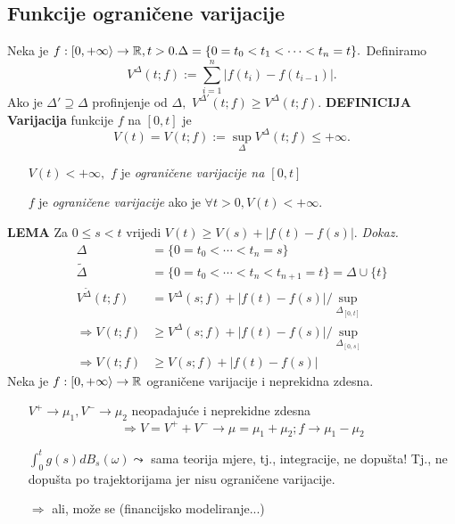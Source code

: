 \documentclass{article}
\begin{document}
\subsection{Funkcije ograničene varijacije}
Neka je \(f:[0,+\infty\rangle\to\Bbb R,t>0.\Delta=\{0=t_0<t_1<\cdots<t_n=t\}.\) Definiramo \[V^\Delta(t;f):=\sum_{i=1}^n|f(t_i)-f(t_{i-1})|.\] Ako je \(\Delta'\supseteq\Delta\) profinjenje od \(\Delta,\) \(V^{\Delta'}(t;f)\ge V^\Delta(t;f).\)\newline\newline
\textbf{DEFINICIJA}\newline
\textbf{Varijacija} funkcije \(f\) na \([0,t]\) je \[V(t)=V(t;f):=\sup_\Delta V^\Delta(t;f)\le+\infty.\]
\begin{enumerate}
    \item[\ding{113}] \(V(t)<+\infty,\) \(f\) je \emph{ograničene varijacije na \([0,t]\)}
    \item[\ding{113}] \(f\) je \emph{ograničene varijacije} ako je \(\forall t>0,V(t)<+\infty.\)
\end{enumerate}
\textbf{LEMA}\newline
Za \(0\le s<t\) vrijedi \(V(t)\ge V(s)+|f(t)-f(s)|.\)\newline\newline
\textit{Dokaz.}
\[\begin{aligned}\Delta&=\{0=t_0<\cdots<t_n=s\}\\\tilde\Delta&=\{0=t_0<\cdots<t_n<t_{n+1}=t\}=\Delta\cup\{t\}\\V^{\tilde\Delta}(t;f)&=V^\Delta(s;f)+|f(t)-f(s)|\bigg/\sup_{\Delta_{[0,t]}}\\\Rightarrow V(t;f)&\ge V^\Delta(s;f)+|f(t)-f(s)|\bigg/\sup_{\Delta_{[0,s]}}\\\Rightarrow V(t;f)&\ge V(s;f)+|f(t)-f(s)|\end{aligned}\]
Neka je \(f:[0,+\infty\rangle\to\Bbb R\) ograničene varijacije i neprekidna zdesna.
\begin{enumerate}
    \item[\ding{228}] \(V^+\to\mu_1,V^-\to\mu_2\) neopadajuće i neprekidne zdesna \[\Rightarrow V=V^++V^-\to\mu=\mu_1+\mu_2;f\to\mu_1-\mu_2\]
    \item[\ding{228}] \(\int_0^tg(s)dB_s(\omega)\leadsto\) sama teorija mjere, tj., integracije, ne dopušta! Tj., ne dopušta po trajektorijama jer nisu ograničene varijacije.\
   \item[\(\Rightarrow\)] ali, može se (financijsko modeliranje...)
\end{enumerate}
\end{document}
